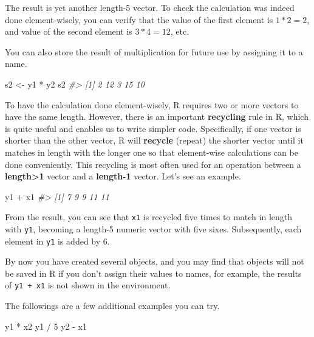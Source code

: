 \documentclass[
]{book}
\newenvironment{Shaded}{\begin{snugshade}}{\end{snugshade}}
\newcommand{\CommentTok}[1]{\textcolor[rgb]{0.56,0.35,0.01}{\textit{#1}}}
\newcommand{\DecValTok}[1]{\textcolor[rgb]{0.00,0.00,0.81}{#1}}
\newcommand{\NormalTok}[1]{#1}
\newcommand{\OtherTok}[1]{\textcolor[rgb]{0.56,0.35,0.01}{#1}}
\newcommand{\SpecialCharTok}[1]{\textcolor[rgb]{0.00,0.00,0.00}{#1}}
\newenvironment{blackbox}{
  \definecolor{shadecolor}{rgb}{0, 0, 0}  %
  \color{white}
  \begin{shaded}}
 {\end{shaded}}
\newenvironment{infobox}[1]
  {
  \begin{itemize}
  \renewcommand{\labelitemi}{
    \raisebox{-.7\height}[0pt][0pt]{
      {\setkeys{Gin}{width=3em,keepaspectratio}
        \texttt{[image: pics/\#1]}}
    }
  }
  \setlength{\fboxsep}{1em}
  \begin{blackbox}
  \item
  }
  {
  \end{blackbox}
  \end{itemize}
  }
\begin{document}
The result is yet another length-5 vector. To check the calculation was indeed done element-wisely, you can verify that the value of the first element is \(1 * 2 = 2\), and value of the second element is \(3 * 4 = 12\), etc.

You can also store the result of multiplication for future use by assigning it to a name.

\begin{Shaded}
\begin{Highlighting}[]
\NormalTok{s2 }\OtherTok{\textless{}{-}}\NormalTok{ y1 }\SpecialCharTok{*}\NormalTok{ y2}
\NormalTok{s2}
\CommentTok{\#\textgreater{} [1]  2 12  3 15 10}
\end{Highlighting}
\end{Shaded}

To have the calculation done element-wisely, R requires two or more vectors to have the same length. However, there is an important \textbf{recycling} rule in R, which is quite useful and enables us to write simpler code. Specifically, if one vector is shorter than the other vector, R will \textbf{recycle} (repeat) the shorter vector until it matches in length with the longer one so that element-wise calculations can be done conveniently. This recycling is most often used for an operation between a \textbf{length\textgreater1} vector and a \textbf{length-1} vector. Let's see an example.

\begin{Shaded}
\begin{Highlighting}[]
\NormalTok{y1 }\SpecialCharTok{+}\NormalTok{ x1}
\CommentTok{\#\textgreater{} [1]  7  9  9 11 11}
\end{Highlighting}
\end{Shaded}

From the result, you can see that \texttt{x1} is recycled five times to match in length with \texttt{y1}, becoming a length-5 numeric vector with five sixes. Subsequently, each element in \texttt{y1} is added by 6.

\begin{infobox}{caution}
By now you have created several objects, and you may find that objects will not be saved in R if you don't assign their values to names, for example, the results of \texttt{y1\ +\ x1} is not shown in the environment.

\end{infobox}

The followings are a few additional examples you can try.

\begin{Shaded}
\begin{Highlighting}[]
\NormalTok{y1 }\SpecialCharTok{*}\NormalTok{ x2}
\NormalTok{y1 }\SpecialCharTok{/} \DecValTok{5}
\NormalTok{y2 }\SpecialCharTok{{-}}\NormalTok{ x1}
\end{Highlighting}
\end{Shaded}
\end{document}
